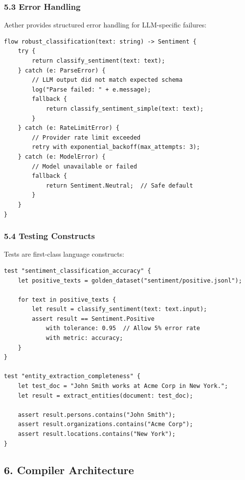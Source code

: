 \documentclass[
]{article}
\begin{document}
\subsubsection{5.3 Error Handling}\label{error-handling}

Aether provides structured error handling for LLM-specific failures:

\begin{lstlisting}
flow robust_classification(text: string) -> Sentiment {
    try {
        return classify_sentiment(text: text);
    } catch (e: ParseError) {
        // LLM output did not match expected schema
        log("Parse failed: " + e.message);
        fallback {
            return classify_sentiment_simple(text: text);
        }
    } catch (e: RateLimitError) {
        // Provider rate limit exceeded
        retry with exponential_backoff(max_attempts: 3);
    } catch (e: ModelError) {
        // Model unavailable or failed
        fallback {
            return Sentiment.Neutral;  // Safe default
        }
    }
}
\end{lstlisting}

\subsubsection{5.4 Testing Constructs}\label{testing-constructs}

Tests are first-class language constructs:

\begin{lstlisting}
test "sentiment_classification_accuracy" {
    let positive_texts = golden_dataset("sentiment/positive.jsonl");
    
    for text in positive_texts {
        let result = classify_sentiment(text: text.input);
        assert result == Sentiment.Positive 
            with tolerance: 0.95  // Allow 5% error rate
            with metric: accuracy;
    }
}

test "entity_extraction_completeness" {
    let test_doc = "John Smith works at Acme Corp in New York.";
    let result = extract_entities(document: test_doc);
    
    assert result.persons.contains("John Smith");
    assert result.organizations.contains("Acme Corp");
    assert result.locations.contains("New York");
}
\end{lstlisting}

\subsection{6. Compiler Architecture}\label{compiler-architecture}
\end{document}
